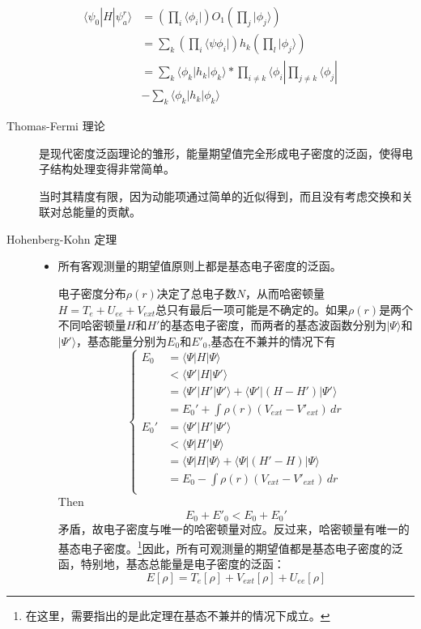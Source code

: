 \documentclass{article}
\numberwithin{equation}{section}
\newcommand{\bra}[1]{\langle #1 |}
\newcommand{\ket}[1]{| #1 \rangle}
\newcommand{\bracketl}[3]{\langle #1 | #2 | #3 \rangle}
\begin{document}
\begin{description}
	\begin{align*}
	\bracketl{\psi_0}{\hat{H}}{\psi_a^r}&=(\prod_i\bra{\phi_i})O_1(\prod_j\ket{\phi_j})\\
	&=\sum_k(\prod_i\bra{\psi{\phi_i}})h_k(\prod_l\ket{\phi_j})\\
	&=\sum_k \bracketl{\phi_k}{h_k}{\phi_k}*\prod_{i \neq k} \bra{\phi_i} \prod_{j \neq k} \bra{\phi_j}\\
	&-\sum_k \bracketl{\phi_k}{h_k}{\phi_k}
	\end{align*}
\end{description}

\begin{description}
	\item[Thomas-Fermi 理论]
		是现代密度泛函理论的雏形，能量期望值完全形成电子密度的泛函，使得电子结构处理变得非常简单。

		当时其精度有限，因为动能项通过简单的近似得到，而且没有考虑交换和关联对总能量的贡献。
	\item[Hohenberg-Kohn 定理]
	\begin{itemize}
		\item 所有客观测量的期望值原则上都是基态电子密度的泛函。

		电子密度分布$\rho(r)$决定了总电子数$N$，从而哈密顿量$H=T_e+U_{ee}+V_{ext}$总只有最后一项可能是不确定的。如果$\rho(r)$是两个不同哈密顿量$H$和$H'$的基态电子密度，而两者的基态波函数分别为$\ket{\Psi}$和$\ket{\Psi'}$，基态能量分别为$E_0$和$E'_0$,基态在不兼并的情况下有
		\begin{equation}
		\begin{cases}
		E_0&=\bracketl{\Psi}{H}{\Psi}\\
		&<\bracketl{\Psi'}{H}{\Psi'}\\
		&=\bracketl{\Psi'}{H'}{\Psi'}+\bracketl{\Psi'}{(H-H')}{\Psi'}\\
		&=E_0'+\int \rho(r)(V_{ext}-V'_{ext})\,dr\\
		E_0'&=\bracketl{\Psi'}{H'}{\Psi'}\\&
		<\bracketl{\Psi}{H'}{\Psi}\\
		&=\bracketl{\Psi}{H}{\Psi}+\bracketl{\Psi}{(H'-H)}{\Psi}\\
		&=E_0-\int \rho(r)(V_{ext}-V'_{ext})\,dr\\
		\end{cases}
		\end{equation}
		Then
		\begin{equation}
		E_0+E'_0<E_0+E_0'
		\end{equation}
		矛盾，故电子密度与唯一的哈密顿量对应。反过来，哈密顿量有唯一的基态电子密度。\footnote{在这里，需要指出的是此定理在基态不兼并的情况下成立。}因此，所有可观测量的期望值都是基态电子密度的泛函，特别地，基态总能量是电子密度的泛函：
		\begin{equation}
		E[\rho]=T_e[\rho]+V_{ext}[\rho]+U_{ee}[\rho]
		\end{equation}


\end{itemize}
\end{description}
\end{document}
